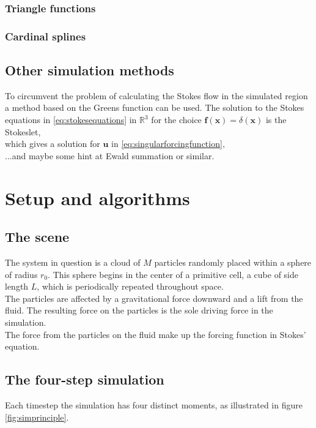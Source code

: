 \documentclass[a4paper,twoside=false,abstract=false,numbers=noenddot,
titlepage=false,headings=small,parskip=half,version=last]{scrartcl}
\begin{document}
\subsubsection{Triangle functions}
\subsubsection{Cardinal splines}

\subsection{Other simulation methods}
To circumvent the problem of calculating the Stokes flow in the simulated region a method based on the Greens function can be used.
The solution to the Stokes equations in \eqref{eq:stokesequations} in $\mathbb{R}^3$ for the choice $\mathbf{f}(\mathbf{x}) = \delta(\mathbf{x})$ is the Stokeslet,
\begin{equation}
[Stokeslet]
\end{equation}
which gives a solution for $\mathbf{u}$ in \eqref{eq:singularforcingfunction},
\begin{equation}
[Solutionsum]
\end{equation}
...and maybe some hint at Ewald summation or similar.

\section{Setup and algorithms}
\subsection{The scene}
The system in question is a cloud of $M$ particles randomly placed within a sphere of radius $r_0$. This sphere begins in the center of a primitive cell, a cube of side length $L$, which is periodically repeated throughout space.\\
The particles are affected by a gravitational force downward and a lift from the fluid. The resulting force on the particles is the sole driving force in the simulation.\\
The force from the particles on the fluid make up the forcing function in Stokes' equation.
\subsection{The four-step simulation}

Each timestep the simulation has four distinct moments, as illustrated in figure \ref{fig:simprinciple}.
\end{document}
